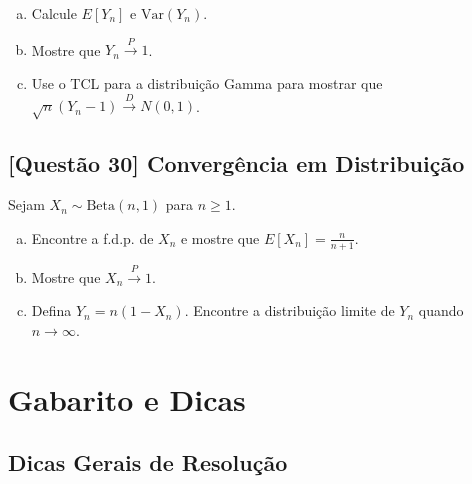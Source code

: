 \documentclass[12pt,a4paper]{article}
\begin{document}
\begin{enumerate}[(a)]
    \item Calcule $E[Y_n]$ e $\text{Var}(Y_n)$.
    \item Mostre que $Y_n \xrightarrow{P} 1$.
    \item Use o TCL para a distribuição Gamma para mostrar que $\sqrt{n}(Y_n - 1) \xrightarrow{D} N(0, 1)$.
\end{enumerate}

\subsection*{[Questão 30] Convergência em Distribuição}

Sejam $X_n \sim \text{Beta}(n, 1)$ para $n \geq 1$.

\begin{enumerate}[(a)]
    \item Encontre a f.d.p. de $X_n$ e mostre que $E[X_n] = \frac{n}{n+1}$.
    \item Mostre que $X_n \xrightarrow{P} 1$.
    \item Defina $Y_n = n(1 - X_n)$. Encontre a distribuição limite de $Y_n$ quando $n \to \infty$.
\end{enumerate}

\section{Gabarito e Dicas}

\subsection{Dicas Gerais de Resolução}
\end{document}
